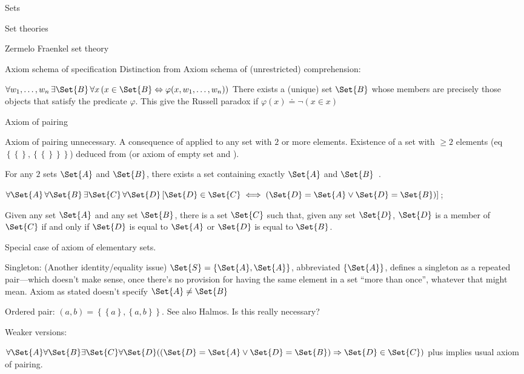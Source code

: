 \begin{plSection}{Sets}
\begin{plSection}{Set theories}
\begin{plSection}{Zermelo Fraenkel set theory}
\begin{plSection}{Axiom schema of specification}
Distinction from Axiom schema of (unrestricted) comprehension:

$\forall w_1,\ldots,w_n \, \exists \Set{B} \, 
\forall x \, ( x \in \Set{B} 
\Leftrightarrow \varphi(x, w_1, \ldots, w_n) )$
There exists a (unique) set $\Set{B}$ 
whose members are precisely those objects 
that satisfy the predicate $\varphi$.
This give the Russell paradox if 
$\varphi(x) \doteq \neg(x \in x)$

\end{plSection}%
\begin{plSection}{Axiom of pairing}
\label{sec:Axiom-of-pairing}

Axiom of pairing unnecessary.
A consequence of 
applied to any set with $2$ or more elements.
Existence of a set with $\geq 2$ elements
(eq $\left\{ \left\{\right\}, \left\{ \left\{\right\} \right\} \right\}$)
deduced from 
(or axiom of empty set\cite{wiki:AxiomOfEmptySet}
and ).

For any $2$ sets $\Set{A}$ and $\Set{B}$,
there exists a set containing exactly $\Set{A}$ and 
$\Set{B}$~\cite{wiki:AxiomOfPairing}.

$\forall \Set{A}\,\forall \Set{B}\,\exists \Set{C}\,\forall \Set{D}\,
[\Set{D}\in \Set{C}\iff (\Set{D}=\Set{A}\lor \Set{D}=\Set{B})]$;

Given any set $\Set{A}$ and any set $\Set{B}$, 
there is a set $\Set{C}$ such that, 
given any set $\Set{D}$, 
$\Set{D}$ is a member of $\Set{C}$ 
if and only if 
$\Set{D}$ is equal to $\Set{A}$ 
or 
$\Set{D}$ is equal to $\Set{B}$.

Special case of axiom of elementary 
sets\cite{wiki:ZermeloSetTheory}.

Singleton:
(Another identity/equality issue)
$\Set{S}=\left\{\Set{A},\Set{A}\right\}$, abbreviated $\left\{\Set{A}\right\}$,
defines a singleton as a repeated pair---which doesn't make sense,
once there's no provision for having the same element
in a set ``more than once'', whatever that might mean.
Axiom as stated doesn't specify $\Set{A} \neq \Set{B}$

Ordered pair:
$(a,b)=\left\{\left\{a\right\},\left\{a,b\right\}\right\}$.
See also Halmos\cite{Halmos:1960:NaiveSetTheory}.
Is this really necessary? 

Weaker versions:
 
${\displaystyle 
\forall \Set{A} \forall \Set{B} 
\exists \Set{C}
\forall \Set{D}((\Set{D}=\Set{A}\lor \Set{D}=\Set{B}) \Rightarrow \Set{D}\in \Set{C})}$
plus 
implies usual axiom of pairing.


\end{plSection}
\end{plSection}
\end{plSection}
\end{plSection}
